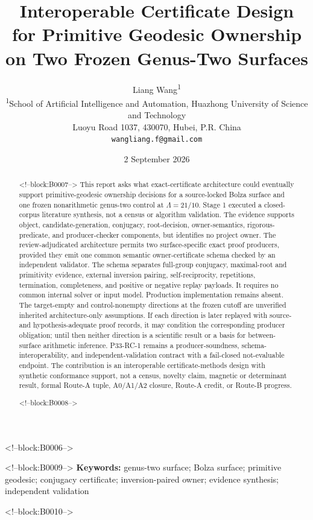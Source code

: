\documentclass[11pt,a4paper]{article}
\title{Interoperable Certificate Design for Primitive Geodesic Ownership on Two Frozen Genus-Two Surfaces}
\author{Liang Wang\textsuperscript{1}\\
\small \textsuperscript{1}School of Artificial Intelligence and Automation, Huazhong University of Science and Technology\\
\small Luoyu Road 1037, 430070, Hubei, P.R. China\\
\small \texttt{wangliang.f@gmail.com}}
\date{2 September 2026}
\begin{document}
\maketitle

<!--block:B0006-->
\begin{abstract}

<!--block:B0007-->
This report asks what exact-certificate architecture could eventually support primitive-geodesic ownership decisions for a source-locked Bolza surface and one frozen nonarithmetic genus-two control at \(\Lambda=21/10\). Stage 1 executed a closed-corpus literature synthesis, not a census or algorithm validation. The evidence supports object, candidate-generation, conjugacy, root-decision, owner-semantics, rigorous-predicate, and producer-checker components, but identifies no project owner. The review-adjudicated architecture permits two surface-specific exact proof producers, provided they emit one common semantic owner-certificate schema checked by an independent validator. The schema separates full-group conjugacy, maximal-root and primitivity evidence, external inversion pairing, self-reciprocity, repetitions, termination, completeness, and positive or negative replay payloads. It requires no common internal solver or input model. Production implementation remains absent. The target-empty and control-nonempty directions at the frozen cutoff are unverified inherited architecture-only assumptions. If each direction is later replayed with source- and hypothesis-adequate proof records, it may condition the corresponding producer obligation; until then neither direction is a scientific result or a basis for between-surface arithmetic inference. P33-RC-1 remains a producer-soundness, schema-interoperability, and independent-validation contract with a fail-closed not-evaluable endpoint. The contribution is an interoperable certificate-methods design with synthetic conformance support, not a census, novelty claim, magnetic or determinant result, formal Route-A tuple, A0/A1/A2 closure, Route-A credit, or Route-B progress.

<!--block:B0008-->
\end{abstract}

<!--block:B0009-->
\noindent\textbf{Keywords:} genus-two surface; Bolza surface; primitive geodesic; conjugacy certificate; inversion-paired owner; evidence synthesis; independent validation

<!--block:B0010-->
\end{document}
